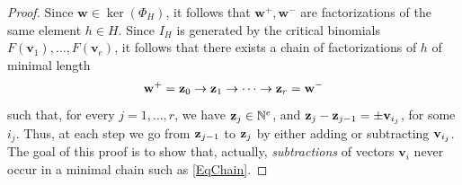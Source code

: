 \documentclass[11pt,twoside]{amsart}
\newcommand{\N}{\mathbb N}
\def\bv{{\mathbf v}}
\def\bw{{\mathbf w}}
\theoremstyle{definition}
\numberwithin{equation}{section}
\begin{document}
\begin{proof}
Since $\bw \in \ker(\Phi_H)$, it follows that $\bw^+, \bw^-$ are factorizations of the same element $h \in H$. 
Since $I_H$ is generated by the critical binomials $F(\bv_1),\ldots, F(\bv_e)$,
it follows that
there exists a chain of factorizations of $h$ of minimal length
\begin{equation}\label{EqChain}
\bw^+ = {\bf z}_0 \rightarrow {\bf z}_1 \rightarrow \cdots \rightarrow {\bf z}_r = \bw^-
    \end{equation}
such that, for every $j=1,\ldots,r$, we have ${\bf z}_j \in \N^e$, and ${\bf z}_j - {\bf z}_{j-1}=\pm {\bf v}_{i_j}$, for some $i_j$. 
Thus, at each step we go from ${\bf z}_{j-1}$ to ${\bf z}_j$ by either adding or subtracting ${\bf v}_{i_j}$. 
The goal of this proof is to show that, actually,  \emph{subtractions} of vectors $\bv_i$ never occur in a minimal chain such as \eqref{EqChain}.


\end{proof}
\end{document}
